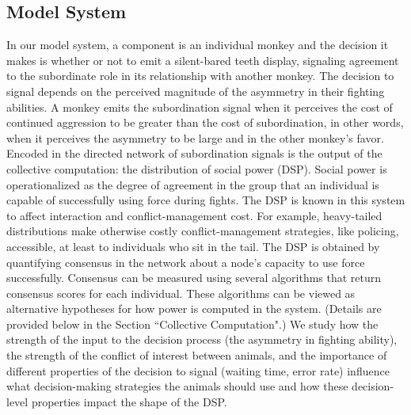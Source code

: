 \documentclass{pnastwo}
\begin{document}
\begin{article}
\subsection{Model System}
In our model system, a component is an individual monkey and the decision it makes is whether or not to emit a silent-bared teeth display, signaling agreement to the subordinate role in its relationship with another monkey. The decision to signal depends on the perceived magnitude of the asymmetry in their fighting abilities. 
A monkey  emits the subordination signal when it perceives the cost of continued aggression to be greater than the cost of subordination, in other words, when it perceives the asymmetry to be large and in the other monkey's favor. Encoded in the directed network of subordination signals is the output of the collective computation: the distribution of social power (DSP). Social power is operationalized as the degree of agreement in the group that an individual is capable of successfully using force during fights. The DSP is known in this system to affect interaction and conflict-management cost. For example, heavy-tailed distributions make otherwise costly conflict-management strategies, like policing, accessible, at least to individuals who sit in the tail. The DSP is obtained by quantifying consensus in the network about a node's capacity to use force successfully. Consensus can be measured using several algorithms that return consensus scores for each individual. These algorithms can be viewed as alternative hypotheses for how power is computed in the system. (Details are provided below in the Section ``Collective Computation".) We study how the strength of the input to the decision process (the asymmetry in fighting ability), the strength of the conflict of interest between animals,  and the importance of different properties of the decision to signal (waiting time, error rate) influence what decision-making strategies the animals should use and how these decision-level properties impact the shape of the DSP. 



\end{article}
\end{document}

